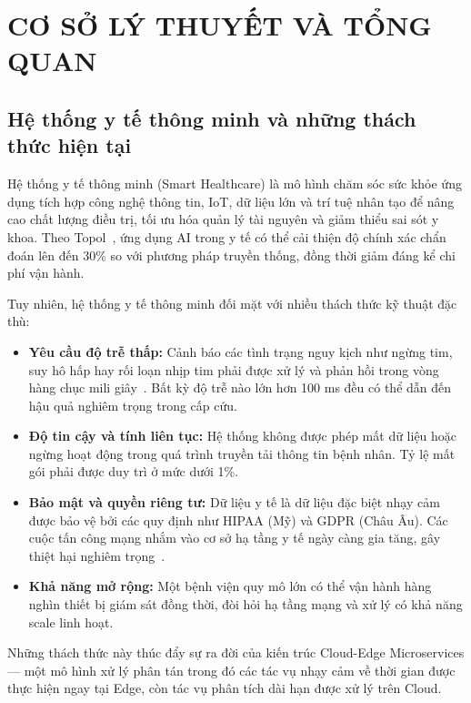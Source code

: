 \chapter{CƠ SỞ LÝ THUYẾT VÀ TỔNG QUAN}

\section{Hệ thống y tế thông minh và những thách thức hiện tại}

Hệ thống y tế thông minh (Smart Healthcare) là mô hình chăm sóc sức khỏe ứng dụng tích hợp công nghệ thông tin, IoT, dữ liệu lớn và trí tuệ nhân tạo để nâng cao chất lượng điều trị, tối ưu hóa quản lý tài nguyên và giảm thiểu sai sót y khoa. Theo Topol~\cite{topol2019}, ứng dụng AI trong y tế có thể cải thiện độ chính xác chẩn đoán lên đến 30\% so với phương pháp truyền thống, đồng thời giảm đáng kể chi phí vận hành.

Tuy nhiên, hệ thống y tế thông minh đối mặt với nhiều thách thức kỹ thuật đặc thù:

\begin{itemize}
    \item \textbf{Yêu cầu độ trễ thấp:} Cảnh báo các tình trạng nguy kịch như ngừng tim, suy hô hấp hay rối loạn nhịp tim phải được xử lý và phản hồi trong vòng hàng chục mili giây~\cite{shi2016edge}. Bất kỳ độ trễ nào lớn hơn 100 ms đều có thể dẫn đến hậu quả nghiêm trọng trong cấp cứu.
    \item \textbf{Độ tin cậy và tính liên tục:} Hệ thống không được phép mất dữ liệu hoặc ngừng hoạt động trong quá trình truyền tải thông tin bệnh nhân. Tỷ lệ mất gói phải được duy trì ở mức dưới 1\%.
    \item \textbf{Bảo mật và quyền riêng tư:} Dữ liệu y tế là dữ liệu đặc biệt nhạy cảm được bảo vệ bởi các quy định như HIPAA (Mỹ) và GDPR (Châu Âu). Các cuộc tấn công mạng nhắm vào cơ sở hạ tầng y tế ngày càng gia tăng, gây thiệt hại nghiêm trọng~\cite{kruse2017cybersecurity}.
    \item \textbf{Khả năng mở rộng:} Một bệnh viện quy mô lớn có thể vận hành hàng nghìn thiết bị giám sát đồng thời, đòi hỏi hạ tầng mạng và xử lý có khả năng scale linh hoạt.
\end{itemize}

Những thách thức này thúc đẩy sự ra đời của kiến trúc Cloud-Edge Microservices — một mô hình xử lý phân tán trong đó các tác vụ nhạy cảm về thời gian được thực hiện ngay tại Edge, còn tác vụ phân tích dài hạn được xử lý trên Cloud.

